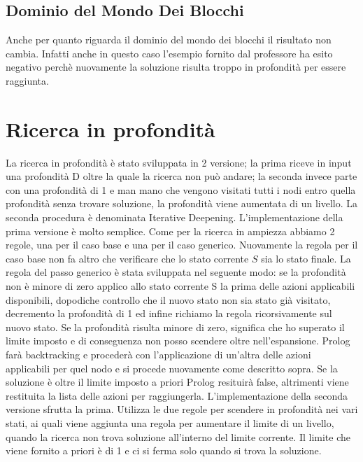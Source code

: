\subsection{Dominio del Mondo Dei Blocchi}
Anche per quanto riguarda il dominio del mondo dei blocchi il risultato non cambia. Infatti anche in questo caso l'esempio fornito dal professore ha esito negativo perchè nuovamente la soluzione risulta troppo in profondità per essere raggiunta.

\section{Ricerca in profondità}
La ricerca in profondità è stato sviluppata in 2 versione; la prima riceve in input una profondità D oltre la quale la ricerca non può andare; la seconda invece parte con una profondità di 1 e man mano che vengono visitati tutti i nodi entro quella profondità senza trovare soluzione, la profondità viene aumentata di un livello. La seconda procedura è denominata Iterative Deepening.
L'implementazione della prima versione è molto semplice. Come per la ricerca in ampiezza abbiamo 2 regole, una per il caso base e una per il caso generico. Nuovamente la regola per il caso base non fa altro che verificare che lo stato corrente $S$ sia lo stato finale. La regola del passo generico è stata sviluppata nel seguente modo: se la profondità non è minore di zero applico allo stato corrente S la prima delle azioni applicabili disponibili, dopodiche controllo che il nuovo stato non sia stato già visitato, decremento la profondità di 1 ed infine richiamo la regola ricorsivamente sul nuovo stato. Se la profondità risulta minore di zero, significa che ho superato il limite imposto e di conseguenza non posso scendere oltre nell'espansione. Prolog farà backtracking e procederà con l'applicazione di un'altra delle azioni applicabili per quel nodo e si procede nuovamente come descritto sopra. Se la soluzione è oltre il limite imposto a priori Prolog resituirà false, altrimenti viene restituita la lista delle azioni per raggiungerla.
L'implementazione della seconda versione sfrutta la prima. Utilizza le due regole per scendere in profondità nei vari stati, ai quali viene aggiunta una regola per aumentare il limite di un livello, quando la ricerca non trova soluzione all'interno del limite corrente. Il limite che viene fornito a priori è di 1 e ci si ferma solo quando si trova la soluzione.

